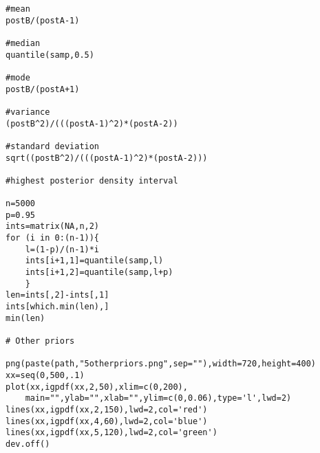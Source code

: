 \documentclass[12pt]{article}
\begin{document}
\begin{scriptsize}
\begin{verbatim}
#mean
postB/(postA-1)

#median
quantile(samp,0.5)

#mode
postB/(postA+1)

#variance
(postB^2)/(((postA-1)^2)*(postA-2))

#standard deviation
sqrt((postB^2)/(((postA-1)^2)*(postA-2)))

#highest posterior density interval

n=5000
p=0.95
ints=matrix(NA,n,2)
for (i in 0:(n-1)){
    l=(1-p)/(n-1)*i
    ints[i+1,1]=quantile(samp,l)
    ints[i+1,2]=quantile(samp,l+p)
    }
len=ints[,2]-ints[,1]
ints[which.min(len),]
min(len)

# Other priors

png(paste(path,"5otherpriors.png",sep=""),width=720,height=400)
xx=seq(0,500,.1)
plot(xx,igpdf(xx,2,50),xlim=c(0,200),
    main="",ylab="",xlab="",ylim=c(0,0.06),type='l',lwd=2)
lines(xx,igpdf(xx,2,150),lwd=2,col='red')
lines(xx,igpdf(xx,4,60),lwd=2,col='blue')
lines(xx,igpdf(xx,5,120),lwd=2,col='green')
dev.off()
\end{verbatim}
\end{scriptsize}
\end{document}
